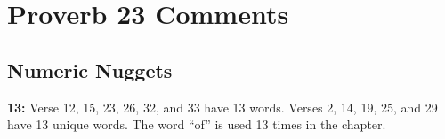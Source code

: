 \section{Proverb 23 Comments}

\subsection{Numeric Nuggets}
\textbf{13:} Verse 12, 15, 23, 26, 32, and 33 have 13 words. Verses 2, 14, 19, 25, and 29 have 13 unique words. The word ``of'' is used 13 times in the chapter.

